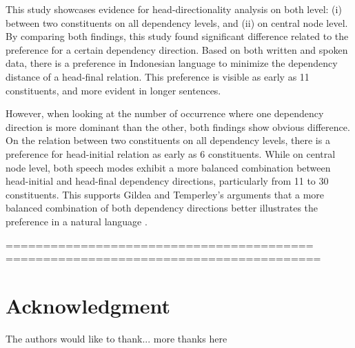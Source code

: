 \documentclass[10pt, a4paper, conference, compsocconf]{IEEEtran}
\begin{document}
This study showcases evidence for head-directionality analysis on both level: (i) between two constituents on all dependency levels, and (ii) on central node level. By comparing both findings, this study found significant difference related to the preference for a certain dependency direction. Based on both written and spoken data, there is a preference in Indonesian language to minimize the dependency distance of a head-final relation. This preference is visible as early as 11 constituents, and more evident in longer sentences.

However, when looking at the number of occurrence where one dependency direction is more dominant than the other, both findings show obvious difference. On the relation between two constituents on all dependency levels, there is a preference for head-initial relation as early as 6 constituents. While on central node level, both speech modes exhibit a more balanced combination between head-initial and head-final dependency directions, particularly from 11 to 30 constituents. This supports Gildea and Temperley's arguments that a more balanced combination of both dependency directions better illustrates the preference in a natural language \cite{gildea2010grammars}.

=========================================
==========================================



\section*{Acknowledgment}


The authors would like to thank...
more thanks here \cite{zipf1949human}




%
%
%
%
%





\end{document}
